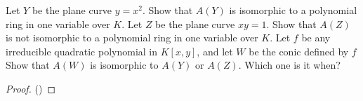 \pagebreak
{}
\begin{exercise}[1.1.1]
    Let $Y$ be the plane curve $y={x}^{2}$. Show that $A(Y)$ is isomorphic to a polynomial ring in one variable over $K$. Let $Z$ be the plane curve $xy=1$. Show that $A(Z)$ is not isomorphic to a polynomial ring in one variable over $K$. Let $f$ be any irreducible quadratic polynomial in $K[x,y]$, and let $W$ be the
    conic defined by $f$ Show that $A(W)$ is isomorphic to $A(Y)$ or $A(Z)$. Which one
    is it when?
\end{exercise}
\begin{proof}
    ()
\end{proof}